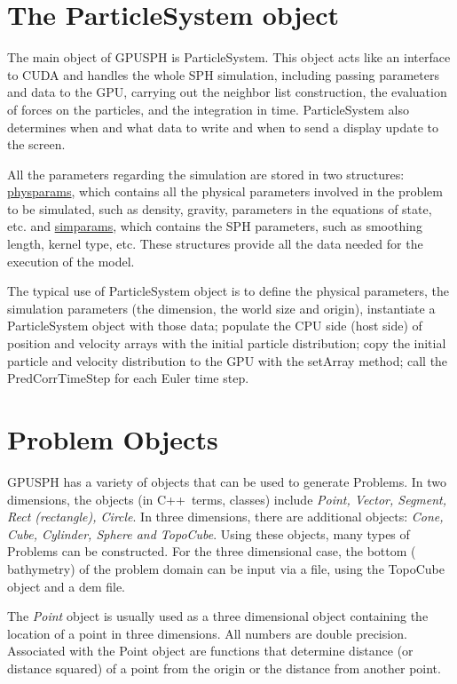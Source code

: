 \documentclass[12pt]{memoir}
\newcommand{\cpp}{{\sffamily C\ttfamily++}}
\begin{document}
\fi

\section{The ParticleSystem object}


The main object of GPUSPH is ParticleSystem. This object acts like an
interface to CUDA and handles the whole SPH simulation, including
passing parameters and data to the GPU, carrying out the neighbor list
construction, the evaluation of forces on the particles, and the
integration in time. ParticleSystem also determines when and what data
to write and when to send a display update to the screen.

All the parameters regarding the simulation are stored in two
structures: \underline{physparams}, which contains all the physical
parameters involved in the problem to be simulated, such as density,
gravity, parameters in the equations of state, etc. and
\underline{simparams}, which contains the SPH parameters, such as
smoothing length, kernel type, etc. These structures provide all the
data needed for the execution of the model.


The typical use of ParticleSystem object is to define the physical
parameters, the simulation parameters (the dimension, the world size and
origin), instantiate a ParticleSystem object with those data; populate
the CPU side (host side) of position and velocity arrays with the
initial particle distribution; copy the initial particle and velocity
distribution to the GPU with the setArray method; call the
PredCorrTimeStep for each Euler time step.


\section{Problem Objects}\label{objects}

GPUSPH has a variety of objects that can be used to generate Problems.
In two dimensions, the objects (in \cpp\ terms, classes) include {\em
Point, Vector, Segment, Rect (rectangle), Circle}. In three
dimensions, there are additional objects: {\em Cone, Cube, Cylinder,
Sphere and TopoCube}. Using these objects, many types of Problems can
be constructed. For the three dimensional case, the bottom (
bathymetry) of the problem domain can be input via a file, using the
TopoCube object and a dem file.

The {\em Point} object is usually used as a three dimensional object
containing the location of a point in three dimensions. All numbers are
double precision. Associated with the Point object are functions that
determine distance (or distance squared) of a point from the origin or
the distance from another point.
\end{document}
